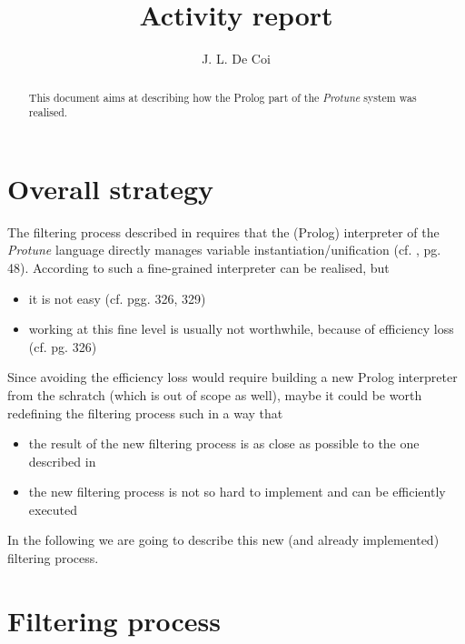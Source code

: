 \documentclass{article}
\begin{document}
\title{Activity report}
\author{J. L. De Coi}

\maketitle

\newtheorem{note}{Note}
\newtheorem{definition}{Definition}
\newtheorem{example}{Example}

\begin{abstract}

This document aims at describing how the Prolog part of the \textit{Protune} system was realised.

\end{abstract}

\section{Overall strategy}

The filtering process described in \cite{Denisa} requires that the (Prolog) interpreter of the \textit{Protune} language directly manages variable instantiation/unification (cf. \cite{Denisa}, pg. 48). According to \cite{PrologArt} such a fine-grained interpreter can be realised, but

\begin{itemize}
	\item it is not easy (cf. \cite{PrologArt} pgg. 326, 329)
	\item working at this fine level is usually not worthwhile, because of efficiency loss (cf. \cite{PrologArt} pg. 326)
\end{itemize}

Since avoiding the efficiency loss would require building a new Prolog interpreter from the schratch (which is out of scope as well), maybe it could be worth redefining the filtering process such in a way that

\begin{itemize}
	\item the result of the new filtering process is as close as possible to the one described in \cite{Denisa}
	\item the new filtering process is not so hard to implement and can be efficiently executed
\end{itemize}

In the following we are going to describe this new (and already implemented) filtering process.

\section{Filtering process}
\end{document}
